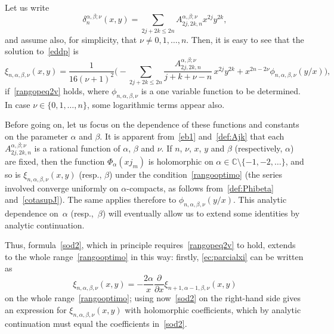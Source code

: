 \documentclass[10pt,leqno,a4paper]{article}
\theoremstyle{plain}
\newcommand{\CC}{\mathbb{C}}
\numberwithin{equation}{section}
\begin{document}
Let us write
\begin{equation}
\label{def:Ajk}
   \delta_n^{\alpha,\beta;\nu}(x,y) = \sum_{2j + 2k \leq 2n} A_{2j,2k,n}^{\alpha,\beta;\nu} x^{2j} y^{2k},
\end{equation}
and assume also, for simplicity, that $\nu\neq 0,1,\dots, n$.
Then, it is easy to see that the solution to~\eqref{eddp} is
\begin{equation}
\label{sod2}
   \xi_{n,\alpha,\beta,\nu}(x,y)
   = \frac{1}{16(\nu+1)^2} \bigg(
   {-} \sum_{2j + 2k \leq 2n}
   \frac{A_{2j,2k,n}^{\alpha,\beta;\nu}}{j+k+\nu - n} \,x^{2j} y^{2k}
   + x^{2n-2\nu} \phi_{n,\alpha,\beta,\nu}(y/x)
   \bigg),
\end{equation}
if~\eqref{rangopeq2v} holds, where $\phi_{n,\alpha,\beta,\nu}$ is a one variable function to be determined. In case $\nu \in \{0,1,\dots,n\}$, some logarithmic terms appear also.

Before going on, let us focus on the dependence of these functions and constants on the parameter $\alpha$ and $\beta$. It is apparent from~\eqref{eb1} and~\eqref{def:Ajk} that each $A_{2j,2k,n}^{\alpha,\beta;\nu}$ is a rational function of $\alpha$, $\beta$ and $\nu$.
If $n$, $\nu$, $x$, $y$ and $\beta$ (respectively, $\alpha$) are fixed, then the function $\Phi_\alpha(x j_m)$ is holomorphic on $\alpha \in \CC \setminus \{-1,-2,\dots\}$, and so is $\xi_{n,\alpha,\beta,\nu}(x,y)$ (resp., $\beta$) under the condition~\eqref{rangooptimo} (the series involved converge uniformly on $\alpha$-compacts, as follows from~\eqref{def:Phibeta} and~\eqref{cotasupJ}). The same applies therefore to $\phi_{n,\alpha,\beta,\nu}(y/x)$. This analytic dependence on~$\alpha$ (resp.,~$\beta$) will eventually allow us to extend some identities by analytic continuation.

Thus, formula~\eqref{sod2}, which in principle requires~\eqref{rangopeq2v} to hold, extends to the whole range~\eqref{rangooptimo} in this way: firstly, \eqref{ec:parcialxi} can be written as
\[
   \xi_{n,\alpha,\beta,\nu}(x,y)
   = - \frac{2\alpha}{x} \frac{\partial}{\partial x} \xi_{n+1,\alpha-1,\beta,\nu}(x,y)
\]
on the whole range~\eqref{rangooptimo}; using now~\eqref{sod2} on the right-hand side gives an expression for $\xi_{n,\alpha,\beta,\nu}(x,y)$ with holomorphic coefficients, which by analytic continuation must equal the coefficients in~\eqref{sod2}.
\end{document}
